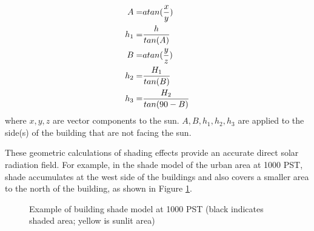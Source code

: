 \documentclass[preprint,3p,12pt,english]{elsarticle}
\begin{document}
\begin{equation}
\centering
\begin{split}
A=&atan(\frac{x}{y})\\
h_1=&\frac{h}{tan(A)}\\
B=&atan(\frac{y}{z})\\
h_2=&\frac{H_1}{tan(B)}\\
h_3=&\frac{H_2}{tan(90-B)}\\
\end{split}
\end{equation}
\noindent where $x,y,z$ are vector components to the sun. $A, B, h_1, h_2, h_3$ are applied to the side(s) of the building that are not facing the sun.

These geometric calculations of shading effects provide an accurate direct solar radiation field. For example, in the shade model of the urban area at 1000 PST, shade accumulates at the west side of the buildings and also covers a smaller area to the north of the building, as shown in Figure \ref{Fig.ShadowExample}.  

\begin{figure}[H]
\graphicspath{ {image/} }
\centering
{}
\caption{Example of building shade model at 1000 PST (black indicates shaded area; yellow is sunlit area)}
\label{Fig.ShadowExample}
\end{figure}
\end{document}
